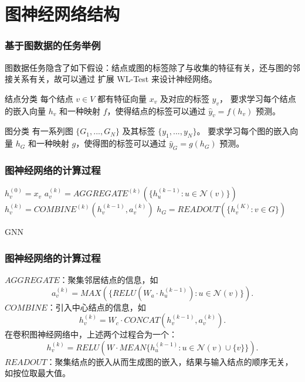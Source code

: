 \documentclass{beamer}
\begin{document}
\section{图神经网络结构}

\begin{frame}

  \frametitle{基于图数据的任务举例}
  图数据任务隐含了如下假设：结点或图的标签除了与收集的特征有关，还与图的邻接关系有关，故可以通过
  扩展 WL-Test 来设计神经网络。
  \begin{block}{结点分类}
    每个结点 $v \in V$ 都有特征向量 $x_v$ 及对应的标签 $y_v$，
    要求学习每个结点的嵌入向量 $h_v$ 和一种映射 $f$，使得结点的标签可以通过 $\hat{y}_v = f(h_v)$ 预测。
  \end{block}
  \begin{block}{图分类}
    有一系列图 $\{G_1, ..., G_N\}$ 及其标签 $\{y_1, ..., y_N\}$。
    要求学习每个图的嵌入向量 $h_G$ 和一种映射 $g$，使得图的标签可以通过 $\hat{y}_G = g(h_G)$ 预测。
  \end{block}

\end{frame}

\begin{frame}

  \frametitle{图神经网络的计算过程}
    \begin{algorithm}[H]
    \begin{algorithmic}[1]
        \STATE $h_v^{(0)} = x_v$
      \ENDFOR
        \STATE $a_v^{(k)} = AGGREGATE^{(k)}(\{h_u^{(k-1)} : u \in \mathcal{N}(v)\})$
        \STATE $h_v^{(k)} = COMBINE^{(k)}(h_v^{(k-1)}, a_v^{(k)})$
      \ENDFOR
      \STATE $h_G = READOUT(\{h_v^{(K)} : v \in G\})$
    \end{algorithmic}
    \caption{GNN}
    \label{alg:gnn}
    \end{algorithm}
      
\end{frame}

\begin{frame}

  \frametitle{图神经网络的计算过程}
      
  $AGGREGATE$：聚集邻居结点的信息，如 
  $$a_v^{(k)} = MAX(\{RELU(W_a \cdot h_u^{(k-1)}) : u \in \mathcal{N}(v)\}).$$
  $COMBINE$：引入中心结点的信息，如
  $$h_v^{(k)} = W_c \cdot CONCAT(h_v^{(k-1)}, a_v^{(k)}).$$
  在卷积图神经网络中，上述两个过程合为一个：
  $$h_v^{(k)} = RELU(W \cdot MEAN \{h_u^{(k-1)} : u \in \mathcal{N}(v) \cup \{v\} \}).$$
  $READOUT$：聚集结点的嵌入从而生成图的嵌入，结果与输入结点的顺序无关，如按位取最大值。
\end{frame}
\end{document}
